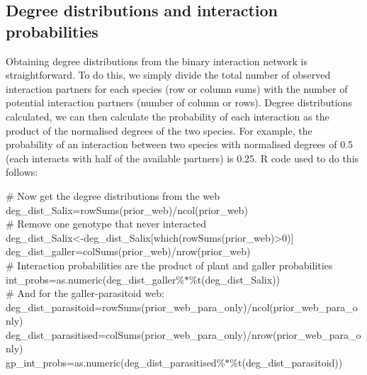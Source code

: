 \documentclass[12pt]{article}
\begin{document}
    \subsection*{Degree distributions and interaction probabilities}

      Obtaining degree distributions from the binary interaction 
      network is straightforward. To do this, we simply divide the 
      total number of observed interaction partners for each 
      species (row or column sums) with the number of potential 
      interaction partners (number of column or rows). Degree 
      distributions calculated, we can then calculate the 
      probability of each interaction as the product of the 
      normalised degrees of the two species. For example, the 
      probability of an interaction between two species with 
      normalised degrees of 0.5 (each interacts with half of the 
      available partners) is 0.25. R code used to do this follows:


      \vspace{12pt}
      \begin{em}
      \noindent \hspace{2pt}\# Now get the degree distributions from the web\\
      \noindent \hspace{2pt}deg\_dist\_Salix=rowSums(prior\_web)/ncol(prior\_web)\\
      \vspace{4pt}
      \noindent \hspace{2pt}\# Remove one genotype that never interacted\\
      \noindent \hspace{2pt}deg\_dist\_Salix\textless-deg\_dist\_Salix[which(rowSums(prior\_web)\textgreater0)]\\
      \noindent \hspace{2pt}deg\_dist\_galler=colSums(prior\_web)/nrow(prior\_web)\\
      \vspace{4pt}
      \noindent \hspace{2pt}\# Interaction probabilities are the product of plant and galler probabilities\\
      \noindent \hspace{2pt}int\_probs=as.numeric(deg\_dist\_galler\%$*$\%t(deg\_dist\_Salix))\\
      \vspace{4pt}
      \noindent \hspace{2pt}\# And for the galler-parasitoid web:\\
      \noindent \hspace{2pt}deg\_dist\_parasitoid=rowSums(prior\_web\_para\_only)/ncol(prior\_web\_para\_only)\\
      \noindent \hspace{2pt}deg\_dist\_parasitised=colSums(prior\_web\_para\_only)/nrow(prior\_web\_para\_only)\\
      \noindent \hspace{2pt}gp\_int\_probs=as.numeric(deg\_dist\_parasitised\%$*$\%t(deg\_dist\_parasitoid))\\
      \end{em}
\end{document}
